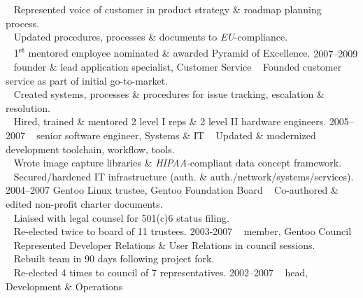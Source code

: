 \documentclass[]{friggeri-cv} %
\begin{document}
\begin{entrylist}
{{\tiny {}} ~ Represented voice of customer  in product strategy \& roadmap planning process.\\
{\tiny {}} ~ Updated procedures, processes \& documents to \emph{EU}-compliance.\\
{\tiny {}} ~ 1\textsuperscript{st} mentored employee nominated \& awarded Pyramid of Excellence.}
\entry
{2007--2009}
{~}
{founder \& lead application specialist, Customer Service}
{{\tiny {}} ~ Founded customer service as part of initial go-to-market.\\
{\tiny {}} ~ Created systems, processes \& procedures for issue tracking, escalation \& resolution.\\
{\tiny {}} ~ Hired, trained \& mentored 2 level I reps \& 2 level II hardware engineers.} 
\entry
{2005--2007}
{~}
{senior software engineer, Systems \& IT}
{{\tiny {}} ~ Updated \& modernized development toolchain, workflow, tools.\\
{\tiny {}} ~ Wrote image capture libraries \& \emph{HIPAA}-compliant data concept framework.\\
{\tiny {}} ~ Secured/hardened IT infrastructure (auth. \& auth./network/systems/services).\\}
\entry
{2004--2007}
{Gentoo Linux}
{trustee, Gentoo Foundation Board}
{{\tiny {}} ~ Co-authored \& edited non-profit charter documents.\\
{\tiny {}} ~ Liaised with legal counsel for 501(c)6 status filing.\\
{\tiny {}} ~ Re-elected twice to board of 11 trustees.}
\entry
{2003-2007}
{~}
{member, Gentoo Council}
{{\tiny {}} ~ Represented Developer Relations \& User Relations in council sessions.\\
{\tiny {}} ~ Rebuilt team in 90 days following project fork.\\
{\tiny {}} ~ Re-elected 4 times to council of 7 representatives.}
\entry
{2002--2007}
{~}
{head, Development \& Operations}

\end{entrylist}
\end{document}
